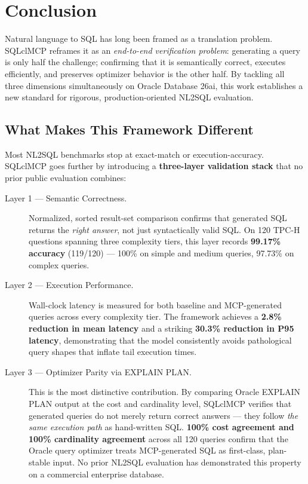 \section{Conclusion}
\label{sec:conclusion}

Natural language to SQL has long been framed as a translation problem. SQLclMCP reframes it as an \emph{end-to-end verification problem}: generating a query is only half the challenge; confirming that it is semantically correct, executes efficiently, and preserves optimizer behavior is the other half. By tackling all three dimensions simultaneously on Oracle Database 26ai, this work establishes a new standard for rigorous, production-oriented NL2SQL evaluation.

\subsection{What Makes This Framework Different}

Most NL2SQL benchmarks stop at exact-match or execution-accuracy. SQLclMCP goes further by introducing a \textbf{three-layer validation stack} that no prior public evaluation combines:

\begin{description}
    \item[Layer 1 — Semantic Correctness.]
    Normalized, sorted result-set comparison confirms that generated SQL returns the \emph{right answer}, not just syntactically valid SQL. On 120 TPC-H questions spanning three complexity tiers, this layer records \textbf{99.17\% accuracy} (119/120) — 100\% on simple and medium queries, 97.73\% on complex queries.

    \item[Layer 2 — Execution Performance.]
    Wall-clock latency is measured for both baseline and MCP-generated queries across every complexity tier. The framework achieves a \textbf{2.8\% reduction in mean latency} and a striking \textbf{30.3\% reduction in P95 latency}, demonstrating that the model consistently avoids pathological query shapes that inflate tail execution times.

    \item[Layer 3 — Optimizer Parity via EXPLAIN PLAN.]
    This is the most distinctive contribution. By comparing Oracle EXPLAIN PLAN output at the cost and cardinality level, SQLclMCP verifies that generated queries do not merely return correct answers — they follow \emph{the same execution path} as hand-written SQL. \textbf{100\% cost agreement and 100\% cardinality agreement} across all 120 queries confirm that the Oracle query optimizer treats MCP-generated SQL as first-class, plan-stable input. No prior NL2SQL evaluation has demonstrated this property on a commercial enterprise database.
\end{description}

